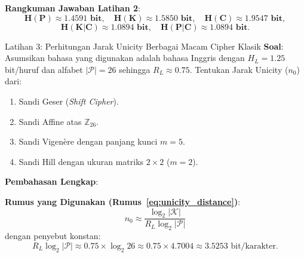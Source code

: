 \documentclass[11pt,a4paper]{article}
\begin{document}
\vspace{0.3em}
\noindent\textbf{Rangkuman Jawaban Latihan 2}:
\[
\mathbf{H(P) \approx 1.4591 \text{ bit}}, \quad \mathbf{H(K) \approx 1.5850 \text{ bit}}, \quad \mathbf{H(C) \approx 1.9547 \text{ bit}},
\]
\[
\mathbf{H(K|C) \approx 1.0894 \text{ bit}}, \quad \mathbf{H(P|C) \approx 1.0894 \text{ bit}}.
\]

\vspace{0.6cm}

\begin{exercisebox}{Latihan 3: Perhitungan Jarak Unicity Berbagai Macam Cipher Klasik}
\textbf{Soal}:
Asumsikan bahasa yang digunakan adalah bahasa Inggris dengan $H_L = 1.25$ bit/huruf dan alfabet $|\mathcal{P}| = 26$ sehingga $R_L \approx 0.75$. Tentukan Jarak Unicity ($n_0$) dari:
\begin{enumerate}
    \item Sandi Geser (\textit{Shift Cipher}).
    \item Sandi Affine atas $\mathbb{Z}_{26}$.
    \item Sandi Vigen\`ere dengan panjang kunci $m = 5$.
    \item Sandi Hill dengan ukuran matriks $2 \times 2$ ($m = 2$).
\end{enumerate}
\end{exercisebox}

\noindent\textbf{Pembahasan Lengkap}:

\noindent\textbf{Rumus yang Digunakan (Rumus~\eqref{eq:unicity_distance})}:
\[
n_0 \approx \frac{\log_2 |\mathcal{K}|}{R_L \log_2 |\mathcal{P}|}
\]
dengan penyebut konstan:
\[
R_L \log_2 |\mathcal{P}| \approx 0.75 \times \log_2 26 \approx 0.75 \times 4.7004 \approx 3.5253 \text{ bit/karakter}.
\]
\end{document}
